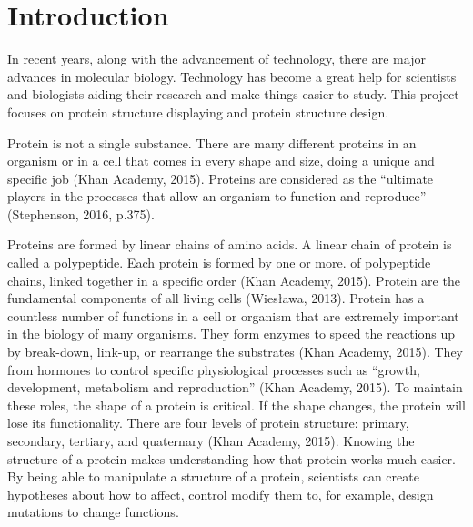 \chapter{Introduction}
\label{ch:intro}

In recent years, along with the advancement of technology, there are major advances in molecular biology. Technology has become a great help for scientists and biologists aiding their research and make things easier to study. This project focuses on protein structure displaying and protein structure design.

Protein is not a single substance. There are many different proteins in an organism or in a cell that comes in every shape and size, doing a unique and specific job (Khan Academy, 2015). Proteins are considered as the “ultimate players in the processes that allow an organism to function and reproduce” (Stephenson, 2016, p.375).

Proteins are formed by linear chains of amino acids. A linear chain of protein is called a polypeptide. Each protein is formed by one or more. of polypeptide chains, linked together in a specific order (Khan Academy, 2015). Protein are the fundamental components of all living cells (Wiesława, 2013). Protein has a countless number of functions in a cell or organism that are extremely important in the biology of many organisms. They form enzymes to speed the reactions up by break-down, link-up, or rearrange the substrates (Khan Academy, 2015). They from hormones to control specific physiological processes such as “growth, development, metabolism and reproduction” (Khan Academy, 2015). To maintain these roles, the shape of a protein is critical. If the shape changes, the protein will lose its functionality. There are four levels of protein structure: primary, secondary, tertiary, and quaternary (Khan Academy, 2015).
Knowing the structure of a protein makes understanding how that protein works much easier. By being able to manipulate a structure of a protein, scientists can create hypotheses about how to affect, control modify them to, for example, design mutations to change functions. 

